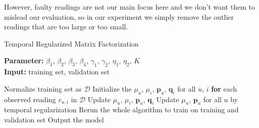 However, faulty readings are not our main focus here and we don't want them to mislead our evaluation, so in our experiment we simply remove the outlier readings that are too large or too small.

\begin{algorithm}
	\caption{Temporal Regularized Matrix Factorization}
	\label{alg:TRMF}
	\textbf{Parameter:} $\beta_1$, $\beta_2$, $\beta_3$, $\beta_4$, $\gamma_1$, $\gamma_2$, $\eta_1$, $\eta_2$, $K$\\
	\textbf{Input:} training set, validation set
	\begin{algorithmic}[1]
		\State Normalize training set as $\mathcal{D}$
		\State Initialize the $\mu_u$, $\mu_i$, $\mathbf{p}_u$, $\mathbf{q}_i$ for all $u$, $i$
		\Repeat
			\State \textbf{for} each observed reading $r_{u,i}$ in $\mathcal{D}$
				\State \indent Update $\mu_u$, $\mu_i$, $\mathbf{p}_{u}$, $\mathbf{q}_{i}$
			\State Update $\mu_u$, $\mathbf{p}_u$ for all $u$ by temporal regularization
		\State Rerun the whole algorithm to train on training and validation set 
		\State Output the model
	\end{algorithmic}
\end{algorithm}


